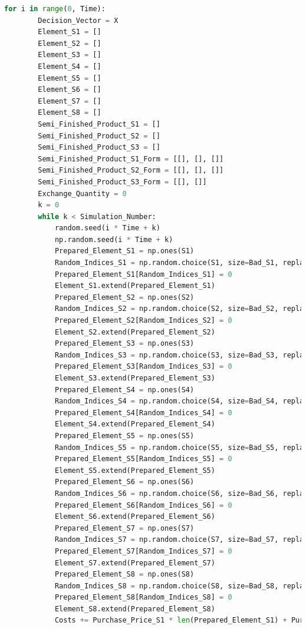 \documentclass[withoutpreface,bwprint]{cumcmthesis} %
\begin{document}
\begin{appendices}
\begin{lstlisting}[language=python]
    for i in range(0, Time):
        Decision_Vector = X
        Element_S1 = []
        Element_S2 = []
        Element_S3 = []
        Element_S4 = []
        Element_S5 = []
        Element_S6 = []
        Element_S7 = []
        Element_S8 = []
        Semi_Finished_Product_S1 = []
        Semi_Finished_Product_S2 = []
        Semi_Finished_Product_S3 = []
        Semi_Finished_Product_S1_Form = [[], [], []]
        Semi_Finished_Product_S2_Form = [[], [], []]
        Semi_Finished_Product_S3_Form = [[], []]
        Exchange_Quantity = 0
        k = 0
        while k < Simulation_Number:
            random.seed(i * Time + k)
            np.random.seed(i * Time + k)
            Prepared_Element_S1 = np.ones(S1)
            Random_Indices_S1 = np.random.choice(S1, size=Bad_S1, replace=False)
            Prepared_Element_S1[Random_Indices_S1] = 0
            Element_S1.extend(Prepared_Element_S1)
            Prepared_Element_S2 = np.ones(S2)
            Random_Indices_S2 = np.random.choice(S2, size=Bad_S2, replace=False)
            Prepared_Element_S2[Random_Indices_S2] = 0
            Element_S2.extend(Prepared_Element_S2)
            Prepared_Element_S3 = np.ones(S3)
            Random_Indices_S3 = np.random.choice(S3, size=Bad_S3, replace=False)
            Prepared_Element_S3[Random_Indices_S3] = 0
            Element_S3.extend(Prepared_Element_S3)
            Prepared_Element_S4 = np.ones(S4)
            Random_Indices_S4 = np.random.choice(S4, size=Bad_S4, replace=False)
            Prepared_Element_S4[Random_Indices_S4] = 0
            Element_S4.extend(Prepared_Element_S4)
            Prepared_Element_S5 = np.ones(S5)
            Random_Indices_S5 = np.random.choice(S5, size=Bad_S5, replace=False)
            Prepared_Element_S5[Random_Indices_S5] = 0
            Element_S5.extend(Prepared_Element_S5)
            Prepared_Element_S6 = np.ones(S6)
            Random_Indices_S6 = np.random.choice(S6, size=Bad_S6, replace=False)
            Prepared_Element_S6[Random_Indices_S6] = 0
            Element_S6.extend(Prepared_Element_S6)
            Prepared_Element_S7 = np.ones(S7)
            Random_Indices_S7 = np.random.choice(S7, size=Bad_S7, replace=False)
            Prepared_Element_S7[Random_Indices_S7] = 0
            Element_S7.extend(Prepared_Element_S7)
            Prepared_Element_S8 = np.ones(S8)
            Random_Indices_S8 = np.random.choice(S8, size=Bad_S8, replace=False)
            Prepared_Element_S8[Random_Indices_S8] = 0
            Element_S8.extend(Prepared_Element_S8)
            Costs += Purchase_Price_S1 * len(Prepared_Element_S1) + Purchase_Price_S2 * len(Prepared_Element_S2)

\end{lstlisting}
\end{appendices}
\end{document}

